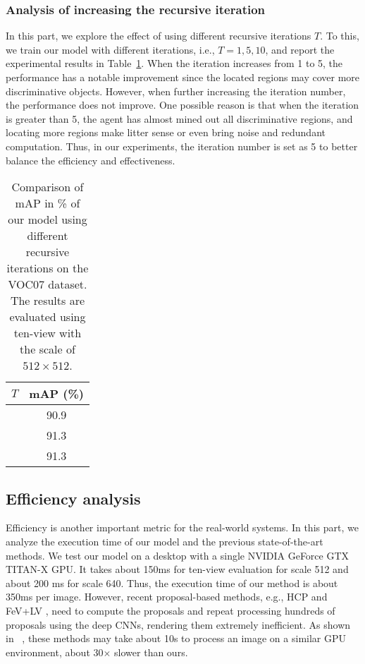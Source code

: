 \documentclass[letterpaper]{article} %
\begin{document}
\subsubsection{Analysis of increasing the recursive iteration}
In this part, we explore the effect of using different recursive iterations $T$. To this, we train our model with different iterations, i.e., $T=1,5,10$, and report the experimental results in Table~\ref{table:recursive_step}. When the iteration increases from 1 to 5, the performance has a notable improvement since the located regions may cover more discriminative objects. However, when further increasing the iteration number, the performance does not improve. One possible reason is that when the iteration is greater than 5, the agent has almost mined out all discriminative regions, and locating more regions make litter sense or even bring noise and redundant computation. Thus, in our experiments, the iteration number is set as 5 to better balance the efficiency and effectiveness.

\begin{table}[htp]
\centering
\begin{tabular}{c|c}
\hline
\centering $T$  & mAP (\%) \\
\hline 
\hline
\centering 1 & 90.9  \\
\centering 5  & 91.3  \\
\centering 10 & 91.3 \\
\hline
\end{tabular}
\caption{Comparison of mAP in \% of our model using different recursive iterations on the VOC07 dataset. The results are evaluated using ten-view with the scale of $512\times 512$.}
\label{table:recursive_step}
\end{table}



\subsection{Efficiency analysis}
Efficiency is another important metric for the real-world systems. In this part, we analyze the execution time of our model and the previous state-of-the-art methods. We test our model on a desktop with a single NVIDIA GeForce GTX TITAN-X GPU. It takes about 150ms for ten-view evaluation for scale 512 and about 200 ms for scale 640. Thus, the execution time of our method is about 350ms per image. However, recent proposal-based methods, e.g., HCP \cite{wei2016hcp} and FeV+LV \cite{yang2016exploit}, need to compute the proposals and repeat processing hundreds of proposals using the deep CNNs, rendering them extremely inefficient. As shown in ~\cite{wei2016hcp}, these methods may take about 10s to process an image on a similar GPU environment, about 30$\times$ slower than ours. 
\end{document}
